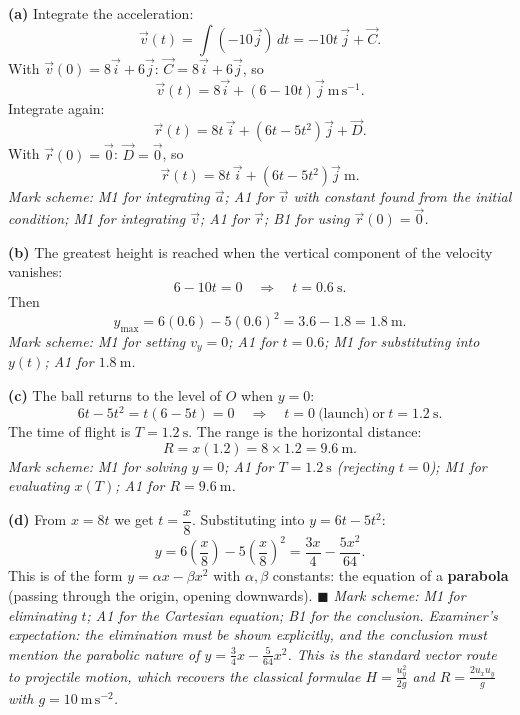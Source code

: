 \documentclass[11pt]{article}
\begin{document}
\begin{corrige}
\textbf{(a)} Integrate the acceleration:
\[ \vec{v}(t) = \int (-10\vec{j})\,dt = -10t\,\vec{j} + \vec{C}. \]
With $\vec{v}(0) = 8\vec{i} + 6\vec{j}$: $\vec{C} = 8\vec{i} + 6\vec{j}$, so
\[ \vec{v}(t) = 8\vec{i} + (6 - 10t)\vec{j}\ \mathrm{m\,s^{-1}}. \]
Integrate again:
\[ \vec{r}(t) = 8t\,\vec{i} + \left(6t - 5t^2\right)\vec{j} + \vec{D}. \]
With $\vec{r}(0) = \vec{0}$: $\vec{D} = \vec{0}$, so
\[ \vec{r}(t) = 8t\,\vec{i} + (6t - 5t^2)\vec{j}\ \mathrm{m}. \]
\emph{Mark scheme: M1 for integrating $\vec{a}$; A1 for $\vec{v}$ with constant found from the initial condition; M1 for integrating $\vec{v}$; A1 for $\vec{r}$; B1 for using $\vec{r}(0) = \vec{0}$.}

\textbf{(b)} The greatest height is reached when the vertical component of the velocity vanishes:
\[ 6 - 10t = 0 \quad\Longrightarrow\quad t = 0.6\ \mathrm{s}. \]
Then
\[ y_{\max} = 6(0.6) - 5(0.6)^2 = 3.6 - 1.8 = 1.8\ \mathrm{m}. \]
\emph{Mark scheme: M1 for setting $v_y = 0$; A1 for $t = 0.6$; M1 for substituting into $y(t)$; A1 for $1.8\ \mathrm{m}$.}

\textbf{(c)} The ball returns to the level of $O$ when $y = 0$:
\[ 6t - 5t^2 = t(6 - 5t) = 0 \quad\Longrightarrow\quad t = 0 \ \text{(launch)} \ \text{or}\ t = 1.2\ \mathrm{s}. \]
The time of flight is $T = 1.2\ \mathrm{s}$. The range is the horizontal distance:
\[ R = x(1.2) = 8 \times 1.2 = 9.6\ \mathrm{m}. \]
\emph{Mark scheme: M1 for solving $y = 0$; A1 for $T = 1.2\ \mathrm{s}$ (rejecting $t = 0$); M1 for evaluating $x(T)$; A1 for $R = 9.6\ \mathrm{m}$.}

\textbf{(d)} From $x = 8t$ we get $t = \dfrac{x}{8}$. Substituting into $y = 6t - 5t^2$:
\[ y = 6\left(\frac{x}{8}\right) - 5\left(\frac{x}{8}\right)^2 = \frac{3x}{4} - \frac{5x^2}{64}. \]
This is of the form $y = \alpha x - \beta x^2$ with $\alpha, \beta$ constants: the equation of a \textbf{parabola} (passing through the origin, opening downwards). $\blacksquare$
\emph{Mark scheme: M1 for eliminating $t$; A1 for the Cartesian equation; B1 for the conclusion. Examiner's expectation: the elimination must be shown explicitly, and the conclusion must mention the parabolic nature of $y = \tfrac{3}{4}x - \tfrac{5}{64}x^2$. This is the standard vector route to projectile motion, which recovers the classical formulae $H = \tfrac{u_y^2}{2g}$ and $R = \tfrac{2u_x u_y}{g}$ with $g = 10\ \mathrm{m\,s^{-2}}$.}
\end{corrige}
\end{document}
